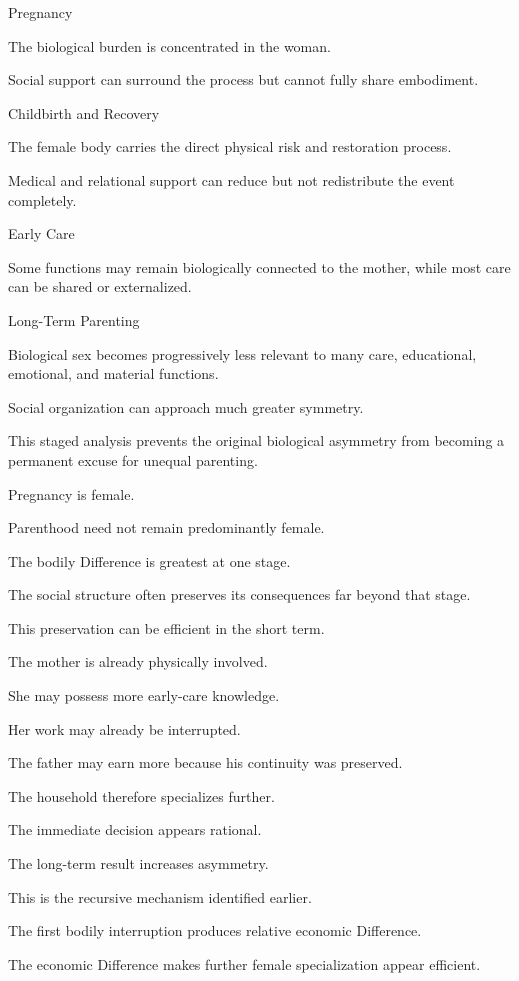 Pregnancy

The biological burden is concentrated in the woman.

Social support can surround the process but cannot fully share embodiment.

Childbirth and Recovery

The female body carries the direct physical risk and restoration process.

Medical and relational support can reduce but not redistribute the event completely.

Early Care

Some functions may remain biologically connected to the mother, while most care can be shared or externalized.

Long-Term Parenting

Biological sex becomes progressively less relevant to many care, educational, emotional, and material functions.

Social organization can approach much greater symmetry.

This staged analysis prevents the original biological asymmetry from becoming a permanent excuse for unequal parenting.

Pregnancy is female.

Parenthood need not remain predominantly female.

The bodily Difference is greatest at one stage.

The social structure often preserves its consequences far beyond that stage.

This preservation can be efficient in the short term.

The mother is already physically involved.

She may possess more early-care knowledge.

Her work may already be interrupted.

The father may earn more because his continuity was preserved.

The household therefore specializes further.

The immediate decision appears rational.

The long-term result increases asymmetry.

This is the recursive mechanism identified earlier.

The first bodily interruption produces relative economic Difference.

The economic Difference makes further female specialization appear efficient.

